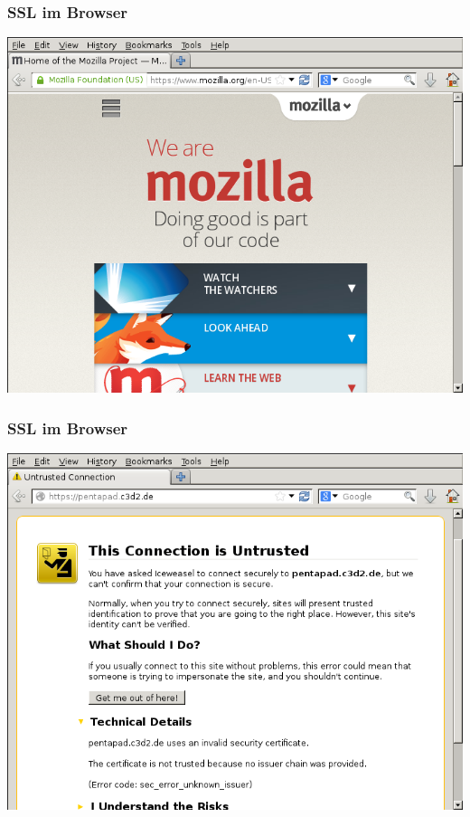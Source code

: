 \documentclass[12pt]{beamer}
\begin{document}
\begin{frame}
    \frametitle{SSL im Browser}
    \includegraphics[height=0.7\textheight]{img/ssl_special.png}
\end{frame}

\begin{frame}
    \frametitle{SSL im Browser}
    \includegraphics[height=0.7\textheight]{img/ssl_unverified.png}
\end{frame}

\end{document}
